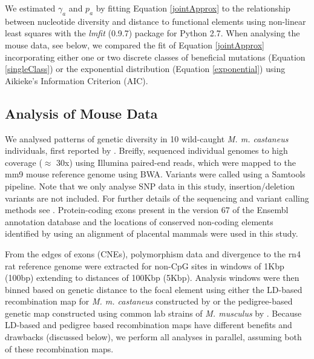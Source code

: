 	
	We estimated $\gamma_a$ and $p_a$ by fitting Equation \ref{jointApprox} to the relationship between nucleotide diversity and distance to functional elements using non-linear least squares with the \emph{lmfit} (0.9.7) package for Python 2.7. When analysing the mouse data, see below, we compared the fit of Equation \ref{jointApprox} incorporating either one or two discrete classes of beneficial mutations (Equation \ref{singleClass}) or the exponential distribution (Equation \ref{exponential}) using Aikieke's Information Criterion (AIC).
	
	

	\subsection{Analysis of Mouse Data}

	We analysed patterns of genetic diversity in 10 wild-caught \textit{M. m. castaneus} individuals, first reported by \cite{RN122}. Breifly, \cite{RN122} sequenced individual genomes to high coverage ($\approx$ 30x) using Illumina paired-end reads, which were mapped to the mm9 mouse reference genome using BWA. Variants were called using a Samtools pipeline. Note that we only analyse SNP data in this study, insertion/deletion variants are not included. For further details of the sequencing and variant calling methods see \cite{RN122}. Protein-coding exons present in the version 67 of the Ensembl annotation database and the locations of conserved non-coding elements identified by \cite{RN122} using an alignment of placental mammals were used in this study.

	From the edges of exons (CNEs), polymorphism data and divergence to the rn4 rat reference genome were extracted for non-CpG sites in windows of 1Kbp (100bp) extending to distances of 100Kbp (5Kbp). Analysis windows were then binned based on genetic distance to the focal element using either the LD-based recombination map for \textit{M. m. castaneus} constructed by \cite{RN340} or the pedigree-based genetic map constructed using common lab strains of \textit{M. musculus} by \cite{RN232}. Because LD-based and pedigree based recombination maps have different benefits and drawbacks (discussed below), we perform all analyses in parallel, assuming both of these recombination maps.

